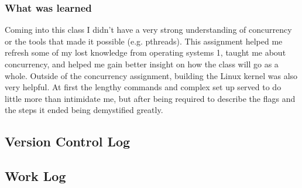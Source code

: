 \documentclass[10pt,draftclsnofoot,onecolumn]{IEEEtran}
\begin{document}
\subsubsection{What was learned}
Coming into this class I didn't have a very strong understanding of concurrency or the tools that made it possible (e.g. pthreads).
This assignment helped me refresh some of my lost knowledge from operating systems 1, taught me about concurrency, and helped me gain better insight on how the class will go as a whole.
Outside of the concurrency assignment, building the Linux kernel was also very helpful.
At first the lengthy commands and complex set up served to do little more than intimidate me, but after being required to describe the flags and the steps it ended being demystified greatly.


\subsection{Version Control Log}

\subsection{Work Log}

\end{document}
